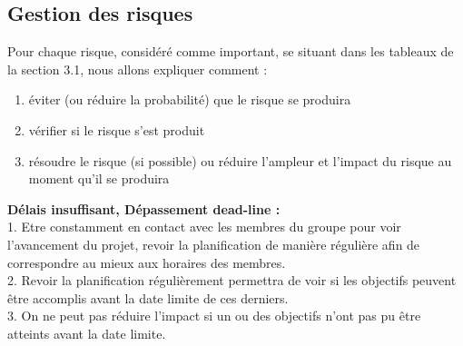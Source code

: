 \documentclass[]{article}
\begin{document}
%

\subsection{Gestion des risques}\label{sec:riskmanagement}
Pour chaque risque, considéré comme important, se situant dans les tableaux de la section 3.1, nous allons expliquer comment :
\begin{enumerate}
\item éviter (ou réduire la probabilité) que le risque se produira
\item vérifier si le risque s'est produit
\item résoudre le risque (si possible) ou réduire l'ampleur et l'impact du risque au moment qu'il se produira
\end{enumerate}

\textbf{Délais insuffisant, Dépassement dead-line  :} \\
1. Etre constamment en contact avec les membres du groupe pour voir l'avancement du projet, revoir la planification de manière régulière
afin de correspondre au mieux aux horaires des membres.\\
2. Revoir la planification régulièrement permettra de voir si les objectifs peuvent être accomplis avant la date limite de ces derniers.\\
3. On ne peut pas réduire l'impact si un ou des objectifs n'ont pas pu être atteints avant la date limite.\\
\end{document}
